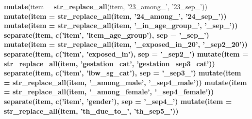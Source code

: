 \documentclass[]{article}
\newenvironment{Shaded}{\begin{snugshade}}{\end{snugshade}}
\newcommand{\DataTypeTok}[1]{\textcolor[rgb]{0.13,0.29,0.53}{#1}}
\newcommand{\KeywordTok}[1]{\textcolor[rgb]{0.13,0.29,0.53}{\textbf{#1}}}
\newcommand{\NormalTok}[1]{#1}
\newcommand{\OperatorTok}[1]{\textcolor[rgb]{0.81,0.36,0.00}{\textbf{#1}}}
\newcommand{\StringTok}[1]{\textcolor[rgb]{0.31,0.60,0.02}{#1}}
\begin{document}
\begin{Shaded}
\begin{Highlighting}[]
{{{{{{{{{{{{{{\StringTok{  }\KeywordTok{mutate}\NormalTok{(}\DataTypeTok{item =} \KeywordTok{str_replace_all}\NormalTok{(item, }\StringTok{'23_among_'}\NormalTok{, }\StringTok{'23_sep_'}\NormalTok{)) }\OperatorTok{%>%}\StringTok{ }
\StringTok{  }\KeywordTok{mutate}\NormalTok{(}\DataTypeTok{item =} \KeywordTok{str_replace_all}\NormalTok{(item, }\StringTok{'24_among_'}\NormalTok{, }\StringTok{'24_sep_'}\NormalTok{)) }\OperatorTok{%>%}\StringTok{ }
\StringTok{  }\KeywordTok{mutate}\NormalTok{(}\DataTypeTok{item =} \KeywordTok{str_replace_all}\NormalTok{(item, }\StringTok{'_in_age_group_'}\NormalTok{, }\StringTok{'_sep_'}\NormalTok{)) }\OperatorTok{%>%}
\StringTok{  }\KeywordTok{separate}\NormalTok{(item, }\KeywordTok{c}\NormalTok{(}\StringTok{'item'}\NormalTok{, }\StringTok{'item_age_group'}\NormalTok{), }\DataTypeTok{sep =} \StringTok{'_sep_'}\NormalTok{) }\OperatorTok{%>%}\StringTok{ }
\StringTok{  }\KeywordTok{mutate}\NormalTok{(}\DataTypeTok{item =} \KeywordTok{str_replace_all}\NormalTok{(item, }\StringTok{'_exposed_in_20'}\NormalTok{, }\StringTok{'_sep2_20'}\NormalTok{))}\OperatorTok{%>%}\StringTok{ }
\StringTok{  }\KeywordTok{separate}\NormalTok{(item, }\KeywordTok{c}\NormalTok{(}\StringTok{'item'}\NormalTok{, }\StringTok{'exposed_in'}\NormalTok{), }\DataTypeTok{sep =} \StringTok{'_sep2_'}\NormalTok{) }\OperatorTok{%>%}\StringTok{  }
\StringTok{  }\KeywordTok{mutate}\NormalTok{(}\DataTypeTok{item =} \KeywordTok{str_replace_all}\NormalTok{(item, }\StringTok{'gestation_cat'}\NormalTok{, }\StringTok{'gestation_sep3_cat'}\NormalTok{))   }\OperatorTok{%>%}\StringTok{ }
\StringTok{  }\KeywordTok{separate}\NormalTok{(item, }\KeywordTok{c}\NormalTok{(}\StringTok{'item'}\NormalTok{, }\StringTok{'lbw_sg_cat'}\NormalTok{), }\DataTypeTok{sep =} \StringTok{'_sep3_'}\NormalTok{) }\OperatorTok{%>%}
\StringTok{  }\KeywordTok{mutate}\NormalTok{(}\DataTypeTok{item =} \KeywordTok{str_replace_all}\NormalTok{(item, }\StringTok{'_among_male'}\NormalTok{, }\StringTok{'_sep4_male'}\NormalTok{)) }\OperatorTok{%>%}\StringTok{ }
\StringTok{  }\KeywordTok{mutate}\NormalTok{(}\DataTypeTok{item =} \KeywordTok{str_replace_all}\NormalTok{(item, }\StringTok{'_among_female'}\NormalTok{, }\StringTok{'_sep4_female'}\NormalTok{)) }\OperatorTok{%>%}\StringTok{ }
\StringTok{  }\KeywordTok{separate}\NormalTok{(item, }\KeywordTok{c}\NormalTok{(}\StringTok{'item'}\NormalTok{, }\StringTok{'gender'}\NormalTok{), }\DataTypeTok{sep =} \StringTok{'_sep4_'}\NormalTok{) }\OperatorTok{%>%}\StringTok{ }
\StringTok{  }\KeywordTok{mutate}\NormalTok{(}\DataTypeTok{item =} \KeywordTok{str_replace_all}\NormalTok{(item, }\StringTok{'th_due_to_'}\NormalTok{, }\StringTok{'th_sep5_'}\NormalTok{)) }\OperatorTok{%>%}\StringTok{ }
}}}}}}}}}}}}}}}}}}}}}}}}}}
\end{Highlighting}
\end{Shaded}
\end{document}
